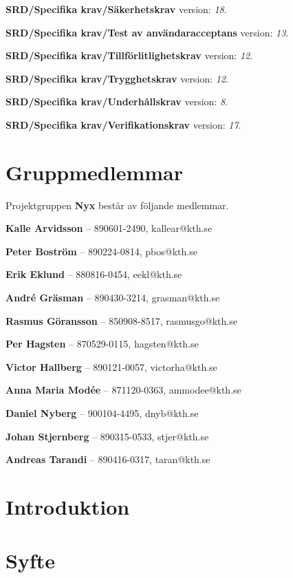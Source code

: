 \documentclass[a4paper, twoside, 11pt, titlepage]{article}
\begin{document}
\textbf{SRD/Specifika krav/Säkerhetskrav} version: \emph{18}.

\textbf{SRD/Specifika krav/Test av användaracceptans} version: \emph{13}.

\textbf{SRD/Specifika krav/Tillförlitlighetskrav} version: \emph{12}.

\textbf{SRD/Specifika krav/Trygghetskrav} version: \emph{12}.

\textbf{SRD/Specifika krav/Underhållskrav} version: \emph{8}.

\textbf{SRD/Specifika krav/Verifikationskrav} version: \emph{17}.

\clearpage
\section*{Gruppmedlemmar}


Projektgruppen \textbf{Nyx} består av följande medlemmar.

\textbf{Kalle Arvidsson} -- 890601-2490, kallear@kth.se

\textbf{Peter Boström} -- 890224-0814, pbos@kth.se

\textbf{Erik Eklund} -- 880816-0454, eekl@kth.se 

\textbf{André Gräsman} -- 890430-3214, grasman@kth.se 

\textbf{Rasmus Göransson} -- 850908-8517, rasmusgo@kth.se 

\textbf{Per Hagsten} -- 870529-0115, hagsten@kth.se

\textbf{Victor Hallberg} -- 890121-0057, victorha@kth.se

\textbf{Anna Maria Modée} -- 871120-0363, ammodee@kth.se 

\textbf{Daniel Nyberg} -- 900104-4495, dnyb@kth.se 

\textbf{Johan Stjernberg} -- 890315-0533, stjer@kth.se

\textbf{Andreas Tarandi} -- 890416-0317, taran@kth.se

\clearpage \tableofcontents \clearpage

\clearpage
\section{Introduktion}



\clearpage
\section{Syfte}
\end{document}

